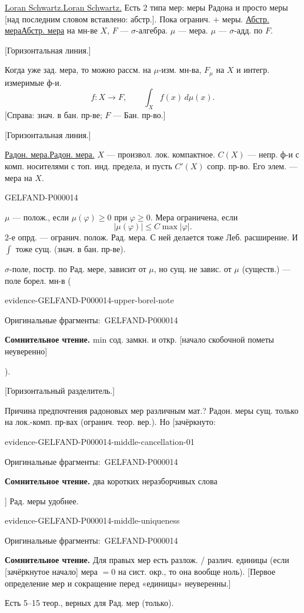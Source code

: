 \documentclass[11pt]{article}
\let\MathUnderline\underline
\renewcommand{\underline}[1]{\ifmmode\MathUnderline{#1}\else\uline{#1}\fi}
\newcommand{\SourcePage}[2]{\par\smallskip\phantomsection\label{#1:source-page}{\small\sffamily\color{blue!55!black}#1}\par\smallskip}
\newcommand{\EvidenceBlock}[4]{%
 \par\smallskip\noindent\begin{minipage}{\linewidth}
 \begin{minipage}[t]{.47\linewidth}\vspace{0pt}\centering
 \csname evidence-#1-#2\endcsname\par
 {\scriptsize\SourceCropCaption\ #1}\par
 \end{minipage}\hfill
 \begin{minipage}[t]{.49\linewidth}\vspace{0pt}\raggedright
 {\small\color{orange!65!black}\textbf{#4} #3}\par
 \end{minipage}
 \end{minipage}\par\smallskip}
\newcommand{\Unclear}[3]{\EvidenceBlock{#1}{#2}{#3}{\ReadingCaption}}
\newcommand{\SourceCropCaption}{Оригинальные фрагменты:}\newcommand{\ReadingCaption}{Сомнительное чтение.}\newcommand{\IncompleteCaption}{Неразобранный фрагмент.}\newcommand{\DiagramCaption}{Рисунок и набранное описание.}
\begin{document}
\underline{Loran Schwartz.}
Есть 2 типа мер: меры Радона и просто меры [над последним словом вставлено: абстр.].
Пока огранич. $+$ меры.
\underline{Абстр. мера} на мн-ве $X$, $F$ --- $\sigma$-алгебра.
$\mu$ --- мера. $\mu$ --- $\sigma$-адд. по $F$.

[Горизонтальная линия.]

Когда уже зад. мера, то можно рассм. на $\mu$-изм. мн-ва, $F_\mu$ на $X$ и интегр. измеримые ф-и.
\begin{equation*}
f:X\longrightarrow F,\qquad \int_Xf(x)\,d\mu(x).
\end{equation*}
[Справа: знач. в бан. пр-ве; $F$ --- Бан. пр-во.]

[Горизонтальная линия.]

\underline{Радон. мера.} $X$ --- произвол. лок. компактное.
$C(X)$ --- непр. ф-и с комп. носителями с топ. инд. предела,
и пусть $C'(X)$ сопр. пр-во.
Его элем. --- мера на $X$.



\SourcePage{GELFAND-P000014}{unlabelled}
$\mu$ --- полож., если $\mu(\varphi)\geq0$ при $\varphi\geq0$.
Мера ограничена, если
\begin{equation*}
|\mu(\varphi)|\leq C\max|\varphi|.
\end{equation*}
2-е опрд. --- огранич. полож. Рад. мера.
С ней делается тоже Леб. расширение.
И $\int$ тоже сущ. (знач. в бан. пр-ве).

$\sigma$-поле, постр. по Рад. мере, зависит от $\mu$, но сущ. не завис. от $\mu$ (существ.) --- поле борел. мн-в
(\Unclear{GELFAND-P000014}{upper-borel-note}{min сод. замкн. и откр. [начало скобочной пометы неуверенно]}).

[Горизонтальный разделитель.]

Причина предпочтения радоновых мер различным мат.?
Радон. меры сущ. только на лок.-комп. пр-вах (огранич. теор. вер.).
Но [зачёркнуто: \Unclear{GELFAND-P000014}{middle-cancellation-01}{два коротких неразборчивых слова}] Рад. меры удобнее.
\Unclear{GELFAND-P000014}{middle-uniqueness}{Для правых мер есть разлож. / различ. единицы (если [зачёркнутое начало] мера $=0$ на сист. окр., то она вообще ноль). [Первое определение мер и сокращение перед «единицы» неуверенны.]}
Есть 5--15 теор., верных для Рад. мер (только).
\end{document}
